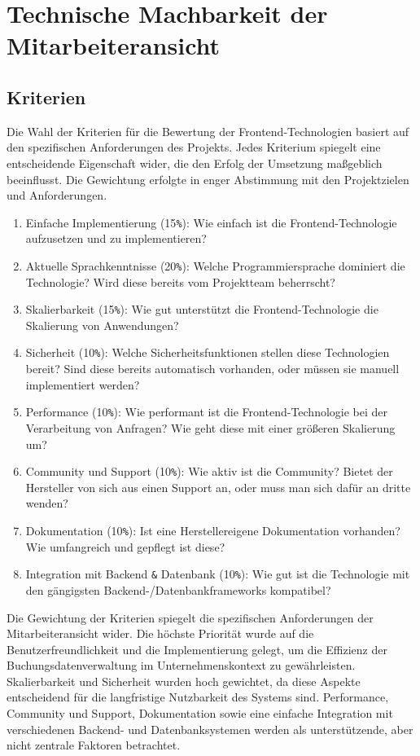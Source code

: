 \section{Technische Machbarkeit der Mitarbeiteransicht}

\subsection{Kriterien}
Die Wahl der Kriterien für die Bewertung der Frontend-Technologien basiert auf den spezifischen Anforderungen des Projekts. Jedes Kriterium spiegelt eine entscheidende Eigenschaft wider, die den Erfolg der Umsetzung maßgeblich beeinflusst. Die Gewichtung erfolgte in enger Abstimmung mit den Projektzielen und Anforderungen.

\begin{enumerate}
	\item Einfache Implementierung (15\verb|%|): Wie einfach ist die Frontend-Technologie aufzusetzen und zu implementieren?
	\item Aktuelle Sprachkenntnisse (20\verb|%|): Welche Programmiersprache dominiert die Technologie? Wird diese bereits vom Projektteam beherrscht?
	\item Skalierbarkeit (15\verb|%|): Wie gut unterstützt die Frontend-Technologie die Skalierung von Anwendungen?
	\item Sicherheit (10\verb|%|): Welche Sicherheitsfunktionen stellen diese Technologien bereit? Sind diese bereits automatisch vorhanden, oder müssen sie manuell implementiert werden?
	\item Performance (10\verb|%|): Wie performant ist die Frontend-Technologie bei der Verarbeitung von Anfragen? Wie geht diese mit einer größeren Skalierung um?
	\item Community und Support (10\verb|%|): Wie aktiv ist die Community? Bietet der Hersteller von sich aus einen Support an, oder muss man sich dafür an dritte wenden?
	\item Dokumentation (10\verb|%|): Ist eine Herstellereigene Dokumentation vorhanden? Wie umfangreich und gepflegt ist diese?
	\item Integration mit Backend \verb|&| Datenbank (10\verb|%|): Wie gut ist die Technologie mit den gängigsten 
    Backend-/Datenbankframeworks kompatibel?
\end{enumerate}

Die Gewichtung der Kriterien spiegelt die spezifischen Anforderungen der Mitarbeiteransicht wider. Die höchste Priorität wurde auf die Benutzerfreundlichkeit und die Implementierung gelegt, um die Effizienz der Buchungsdatenverwaltung im Unternehmenskontext zu gewährleisten. Skalierbarkeit und Sicherheit wurden hoch gewichtet, da diese Aspekte entscheidend für die langfristige Nutzbarkeit des Systems sind. Performance, Community und Support, Dokumentation sowie eine einfache Integration mit verschiedenen Backend- und Datenbanksystemen werden als unterstützende, aber nicht zentrale Faktoren betrachtet.

